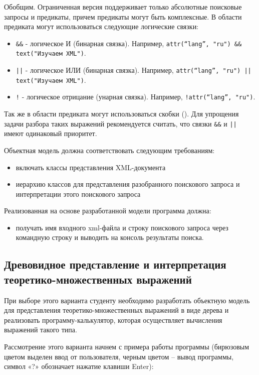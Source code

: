 \documentclass[a4paper,12pt]{article}
\begin{document}
Обобщим. Ограниченная версия поддерживает только абсолютные поисковые
запросы и предикаты, причем предикаты могут быть комплексные. В
области предиката могут использоваться следующие логические связки:

\begin{itemize}
\item \verb+&&+ - логическое И (бинарная связка). Например,
  \verb+attr(“lang”, "ru") && text("Изучаем XML")+.
\item \verb+||+ - логическое ИЛИ (бинарная связка). Например,
  \verb+attr(“lang”, "ru") || text("Изучаем XML")+.
\item \verb+!+ - логическое отрицание (унарная связка). Например,
  \verb+!attr(“lang”, "ru")+.
\end{itemize}

Так же в области предиката могут использоваться скобки (). Для
упрощения задачи разбора таких выражений рекомендуется считать, что
связки \verb+&&+ и \verb+||+ имеют одинаковый приоритет.

Объектная модель должна соответствовать следующим требованиям: 

\begin{itemize}
\item включать классы представления XML-документа
\item иерархию классов для представления разобранного поискового
  запроса и интерпретации этого поискового запроса
\end{itemize}

Реализованная на основе разработанной модели программа должна:

\begin{itemize}
\item получать имя входного xml-файла и строку поискового запроса
  через командную строку и выводить на консоль результаты поиска.
\end{itemize}

\subsection{Древовидное представление и интерпретация теоретико-множественных выражений}

При выборе этого варианта студенту необходимо разработать объектную
модель для представления теоретико-множественных выражений в виде
дерева и реализовать программу-калькулятор, которая осуществляет
вычисления выражений такого типа.

Рассмотрение этого варианта начнем с примера работы программы
(бирюзовым цветом выделен ввод от пользователя, черным цветом – вывод
программы, символ «?» обозначает нажатие клавиши Enter):
\end{document}
